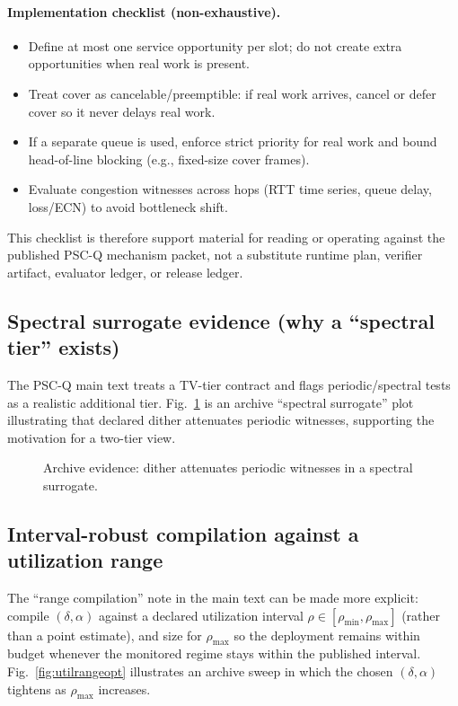 \documentclass[11pt]{article}
\theoremstyle{definition}
\theoremstyle{remark}
\begin{document}
\paragraph{Implementation checklist (non-exhaustive).}
\begin{itemize}[leftmargin=1.2em]
\item Define at most one service opportunity per slot; do not create extra opportunities when real work is present.
\item Treat cover as cancelable/preemptible: if real work arrives, cancel or defer cover so it never delays real work.
\item If a separate queue is used, enforce strict priority for real work and bound head-of-line blocking (e.g., fixed-size cover frames).
\item Evaluate congestion witnesses across hops (RTT time series, queue delay, loss/ECN) to avoid bottleneck shift.
\end{itemize}
This checklist is therefore support material for reading or operating against the published PSC-Q mechanism packet, not a substitute runtime plan, verifier artifact, evaluator ledger, or release ledger.\cite{series:pscq,series:wcongeq,series:evalnotary,series:opb,series:releaseproperty}

\subsection{Spectral surrogate evidence (why a ``spectral tier'' exists)}
The PSC-Q main text treats a TV-tier contract and flags periodic/spectral tests as a realistic additional tier.
Fig.~\ref{fig:spectral} is an archive ``spectral surrogate'' plot illustrating that declared dither attenuates periodic witnesses,
supporting the motivation for a two-tier view.

\begin{figure}[t]
\centering
{}
\caption{Archive evidence: dither attenuates periodic witnesses in a spectral surrogate.}
\label{fig:spectral}
\end{figure}

\subsection{Interval-robust compilation against a utilization range}
The ``range compilation'' note in the main text can be made more explicit:
compile $(\delta,\alpha)$ against a declared utilization interval $\rho\in[\rho_{\min},\rho_{\max}]$ (rather than a point estimate),
and size for $\rho_{\max}$ so the deployment remains within budget whenever the monitored regime stays within the published interval.
Fig.~\ref{fig:utilrangeopt} illustrates an archive sweep in which the chosen $(\delta,\alpha)$ tightens as $\rho_{\max}$ increases.
\end{document}
